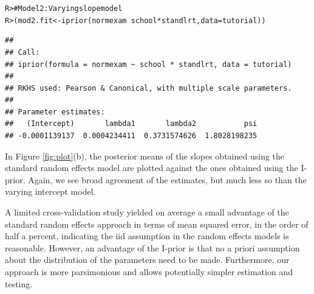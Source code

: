 \documentclass[a4paper,showframe,11pt]{report}\usepackage[]{graphicx}\usepackage[]{color}
\makeatletter
\newcommand{\hlcom}[1]{\textcolor[rgb]{0.588,0.588,0.588}{#1}}%
\newcommand{\hlopt}[1]{\textcolor[rgb]{0.196,0.196,0.196}{#1}}%
\newcommand{\hlstd}[1]{\textcolor[rgb]{0.196,0.196,0.196}{#1}}%
\newcommand{\hlkwb}[1]{\textcolor[rgb]{0.627,0,0.314}{#1}}%
\newcommand{\hlkwc}[1]{\textcolor[rgb]{0,0.631,0.314}{#1}}%
\newcommand{\hlkwd}[1]{\textcolor[rgb]{0.78,0.227,0.412}{#1}}%
\newenvironment{kframe}{%
 \def\at@end@of@kframe{}%
 \ifinner\ifhmode%
  \def\at@end@of@kframe{\end{minipage}}%
  \begin{minipage}{\columnwidth}%
 \fi\fi%
 \def\FrameCommand##1{\hskip\@totalleftmargin \hskip-\fboxsep
 \colorbox{shadecolor}{##1}\hskip-\fboxsep
     \hskip-\linewidth \hskip-\@totalleftmargin \hskip\columnwidth}%
 \MakeFramed {\advance\hsize-\width
   \@totalleftmargin\z@ \linewidth\hsize
   \@setminipage}}%
 {\par\unskip\endMakeFramed%
 \at@end@of@kframe}
\newenvironment{knitrout}{}{} %
\makeatother
\begin{document}
\begin{knitrout}
\color{fgcolor}\begin{kframe}
\begin{alltt}
\hlstd{R> }\hlcom{# Model 2: Varying slope model}
\hlstd{R> }\hlstd{(mod2.fit} \hlkwb{<-} \hlkwd{iprior}\hlstd{(normexam} \hlopt{~} \hlstd{school} \hlopt{*} \hlstd{standlrt,} \hlkwc{data} \hlstd{= tutorial))}
\end{alltt}
\end{kframe}
\end{knitrout}
\begin{knitrout}
\color{fgcolor}\begin{kframe}
\begin{verbatim}
## 
## Call:
## iprior(formula = normexam ~ school * standlrt, data = tutorial)
## 
## RKHS used: Pearson & Canonical, with multiple scale parameters.
## 
## Parameter estimates:
##   (Intercept)       lambda1       lambda2           psi 
## -0.0001139137  0.0004234411  0.3731574626  1.8028198235
\end{verbatim}
\end{kframe}
\end{knitrout}

In Figure \ref{fig:plot}(b), the posterior means of the slopes obtained using the standard random effects model are plotted against the ones obtained using the I-prior. Again, we see broad agreement of the estimates, but much less so than the varying intercept model.

A limited cross-validation study yielded on average a small advantage of the standard random effects approach in terms of mean squared error, in the order of half a percent, indicating the iid assumption in the random effects models is reasonable. However, an advantage of the I-prior is that no a priori assumption about the distribution of the parameters need to be made. Furthermore, our approach is more parsimonious and allows potentially simpler estimation and testing.
\end{document}
